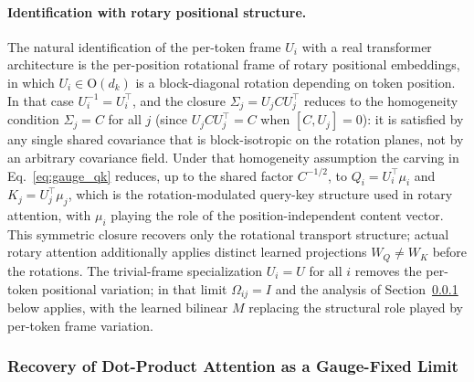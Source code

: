 \documentclass[11pt]{article}
\begin{document}
\paragraph{Identification with rotary positional structure.}
The natural identification of the per-token frame $U_i$ with a real transformer architecture is the per-position rotational frame of rotary positional embeddings, in which $U_i \in \mathrm{O}(d_k)$ is a block-diagonal rotation depending on token position. In that case $U_i^{-1} = U_i^\top$, and the closure $\Sigma_j = U_j C U_j^\top$ reduces to the homogeneity condition $\Sigma_j = C$ for all $j$ (since $U_j C U_j^\top = C$ when $[C, U_j] = 0$): it is satisfied by any single shared covariance that is block-isotropic on the rotation planes, not by an arbitrary covariance field. Under that homogeneity assumption the carving in Eq.~\eqref{eq:gauge_qk} reduces, up to the shared factor $C^{-1/2}$, to $Q_i = U_i^\top\mu_i$ and $K_j = U_j^\top\mu_j$, which is the rotation-modulated query-key structure used in rotary attention, with $\mu_i$ playing the role of the position-independent content vector. This symmetric closure recovers only the rotational transport structure; actual rotary attention additionally applies distinct learned projections $W_Q \neq W_K$ before the rotations. The trivial-frame specialization $U_i = U$ for all $i$ removes the per-token positional variation; in that limit $\Omega_{ij} = I$ and the analysis of Section~\ref{sec:dot_product_derivation} below applies, with the learned bilinear $M$ replacing the structural role played by per-token frame variation.

\subsubsection{Recovery of Dot-Product Attention as a Gauge-Fixed Limit}
\label{sec:dot_product_derivation}
\end{document}
